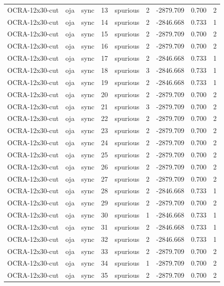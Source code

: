 \begin{tabular}{lllrlrrrr}
OCRA-12x30-cut & oja & sync & 13 & spurious & 2 & -2879.709 & 0.700 & 2 \\
OCRA-12x30-cut & oja & sync & 14 & spurious & 2 & -2846.668 & 0.733 & 1 \\
OCRA-12x30-cut & oja & sync & 15 & spurious & 2 & -2879.709 & 0.700 & 2 \\
OCRA-12x30-cut & oja & sync & 16 & spurious & 2 & -2879.709 & 0.700 & 2 \\
OCRA-12x30-cut & oja & sync & 17 & spurious & 2 & -2846.668 & 0.733 & 1 \\
OCRA-12x30-cut & oja & sync & 18 & spurious & 3 & -2846.668 & 0.733 & 1 \\
OCRA-12x30-cut & oja & sync & 19 & spurious & 2 & -2846.668 & 0.733 & 1 \\
OCRA-12x30-cut & oja & sync & 20 & spurious & 2 & -2879.709 & 0.700 & 2 \\
OCRA-12x30-cut & oja & sync & 21 & spurious & 3 & -2879.709 & 0.700 & 2 \\
OCRA-12x30-cut & oja & sync & 22 & spurious & 2 & -2879.709 & 0.700 & 2 \\
OCRA-12x30-cut & oja & sync & 23 & spurious & 2 & -2879.709 & 0.700 & 2 \\
OCRA-12x30-cut & oja & sync & 24 & spurious & 2 & -2879.709 & 0.700 & 2 \\
OCRA-12x30-cut & oja & sync & 25 & spurious & 2 & -2879.709 & 0.700 & 2 \\
OCRA-12x30-cut & oja & sync & 26 & spurious & 2 & -2879.709 & 0.700 & 2 \\
OCRA-12x30-cut & oja & sync & 27 & spurious & 2 & -2879.709 & 0.700 & 2 \\
OCRA-12x30-cut & oja & sync & 28 & spurious & 2 & -2846.668 & 0.733 & 1 \\
OCRA-12x30-cut & oja & sync & 29 & spurious & 2 & -2879.709 & 0.700 & 2 \\
OCRA-12x30-cut & oja & sync & 30 & spurious & 1 & -2846.668 & 0.733 & 1 \\
OCRA-12x30-cut & oja & sync & 31 & spurious & 2 & -2846.668 & 0.733 & 1 \\
OCRA-12x30-cut & oja & sync & 32 & spurious & 2 & -2846.668 & 0.733 & 1 \\
OCRA-12x30-cut & oja & sync & 33 & spurious & 2 & -2879.709 & 0.700 & 2 \\
OCRA-12x30-cut & oja & sync & 34 & spurious & 1 & -2879.709 & 0.700 & 2 \\
OCRA-12x30-cut & oja & sync & 35 & spurious & 2 & -2879.709 & 0.700 & 2 \\

\end{tabular}
